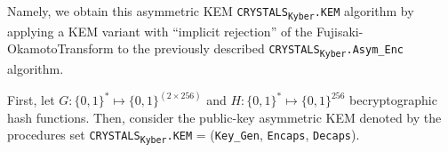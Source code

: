 \documentclass[runningheads]{llncs}
\numberwithin{equation}{section}
\begin{document}
    Namely, we obtain this asymmetric KEM \texorpdfstring{\texttt{CRYSTALS}\textsubscript{\texttt{Kyber}}\texttt{.KEM}}\/ algorithm by applying a KEM variant with ``implicit rejection'' \cite{hofheinz-hovelmanns-kiltz:modular-analysis-fujisaki-okamoto-transformation:2017:06-2024} of the Fujisaki-Okamoto\break Transform \cite{fujisaki-okamoto:secure-integration-asymmetric-and-symmetric-encryption-schemes:2013:06-2024} to the previously described \texorpdfstring{\texttt{CRYSTALS}\textsubscript{\texttt{Kyber}}\texttt{.Asym\_Enc}}\/ algorithm.

    First, let $G: { \{ 0, 1 \} }^{*} \mapsto { \{ 0, 1 \} }^{ ( 2 \times 256 ) }$ and $H: { \{ 0, 1 \} }^{*} \mapsto { \{ 0, 1 \} }^{ 256 }$ be\break cryptographic hash functions. Then, consider the public-key asymmetric KEM denoted by the procedures set \texorpdfstring{\texttt{CRYSTALS}\textsubscript{\texttt{Kyber}}\texttt{.KEM} = \big(\texttt{Key\_Gen}, \texttt{Encaps}, \texttt{Decaps}\big)}\/.

    \vspace{2ex}
    
\end{document}
